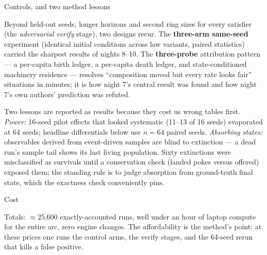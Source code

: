 \secc Controls, and two method lessons

Beyond held-out seeds, longer horizons and second ring sizes for
every satisfier (the {\it adversarial verify} stage), two designs
recur. The {\bf three-arm same-seed} experiment (identical initial
conditions across law variants, paired statistics) carried the
sharpest results of nights 8--10. The {\bf three-probe} attribution
pattern --- a per-capita birth ledger, a per-capita death ledger,
and state-conditioned machinery residence --- resolves “composition
moved but every rate looks fair” situations in minutes; it is how
night 7's central result was found and how night 7's own authors'
prediction was refuted.

Two lessons are reported as results because they cost us wrong
tables first. {\it Power:} 16-seed pilot effects that looked
systematic (11--13 of 16 seeds) evaporated at 64 seeds; headline
differentials below use $n{=}64$ paired seeds. {\it Absorbing
states:} observables derived from event-driven samples are blind to
extinction --- a dead run's sample tail shows its last living
population. Sixty extinctions were misclassified as survivals until
a conservation check (landed pokes versus offered) exposed them; the
standing rule is to judge absorption from ground-truth final state,
which the exactness check conveniently pins.

\secc Cost

\medskip
\noindent{}
\medskip

\noindent Totals: $\approx$25{,}600 exactly-accounted runs, well
under an hour of laptop compute for the entire arc, zero engine
changes. The affordability is the method's point: at these prices
one runs the control arms, the verify stages, and the 64-seed
rerun that kills a false positive.

